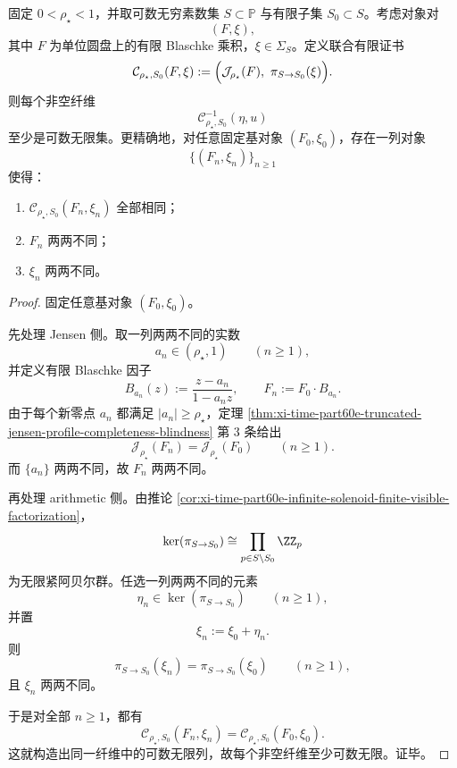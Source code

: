 \begin{theorem}[有限半径证书与有限素数证书的统一不可完备性]\label{thm:xi-time-part60e-finite-radius-finite-prime-certificate-incompleteness}
固定 \(0<\rho_\star<1\)，并取可数无穷素数集 \(S\subset\mathbb P\) 与有限子集 \(S_0\subset S\)。考虑对象对
\[
(F,\xi),
\]
其中 \(F\) 为单位圆盘上的有限 Blaschke 乘积，\(\xi\in \Sigma_S\)。定义联合有限证书
\[
\mathcal C_{\rho_\star,S_0}(F,\xi)
:=
\Bigl(
\mathcal J_{\rho_\star}(F),\ \pi_{S\to S_0}(\xi)
\Bigr).
\]
则每个非空纤维
\[
\mathcal C_{\rho_\star,S_0}^{-1}(\eta,u)
\]
至少是可数无限集。更精确地，对任意固定基对象 \((F_0,\xi_0)\)，存在一列对象
\[
\{(F_n,\xi_n)\}_{n\ge 1}
\]
使得：
\begin{enumerate}
  \item \(\mathcal C_{\rho_\star,S_0}(F_n,\xi_n)\) 全部相同；
  \item \(F_n\) 两两不同；
  \item \(\xi_n\) 两两不同。
\end{enumerate}
\end{theorem}
\begin{proof}
固定任意基对象 \((F_0,\xi_0)\)。

先处理 Jensen 侧。取一列两两不同的实数
\[
a_n\in(\rho_\star,1)
\qquad(n\ge 1),
\]
并定义有限 Blaschke 因子
\[
B_{a_n}(z):=\frac{z-a_n}{1-a_n z},
\qquad
F_n:=F_0\cdot B_{a_n}.
\]
由于每个新零点 \(a_n\) 都满足 \(|a_n|\ge \rho_\star\)，定理 \ref{thm:xi-time-part60e-truncated-jensen-profile-completeness-blindness} 第 \(3\) 条给出
\[
\mathcal J_{\rho_\star}(F_n)=\mathcal J_{\rho_\star}(F_0)
\qquad(n\ge 1).
\]
而 \(\{a_n\}\) 两两不同，故 \(F_n\) 两两不同。

再处理 arithmetic 侧。由推论 \ref{cor:xi-time-part60e-infinite-solenoid-finite-visible-factorization}，
\[
\ker(\pi_{S\to S_0})
\cong
\prod_{p\in S\setminus S_0}\ZZ_p
\]
为无限紧阿贝尔群。任选一列两两不同的元素
\[
\eta_n\in \ker(\pi_{S\to S_0})
\qquad(n\ge 1),
\]
并置
\[
\xi_n:=\xi_0+\eta_n.
\]
则
\[
\pi_{S\to S_0}(\xi_n)=\pi_{S\to S_0}(\xi_0)
\qquad(n\ge 1),
\]
且 \(\xi_n\) 两两不同。

于是对全部 \(n\ge 1\)，都有
\[
\mathcal C_{\rho_\star,S_0}(F_n,\xi_n)
=
\mathcal C_{\rho_\star,S_0}(F_0,\xi_0).
\]
这就构造出同一纤维中的可数无限列，故每个非空纤维至少可数无限。证毕。
\end{proof}

